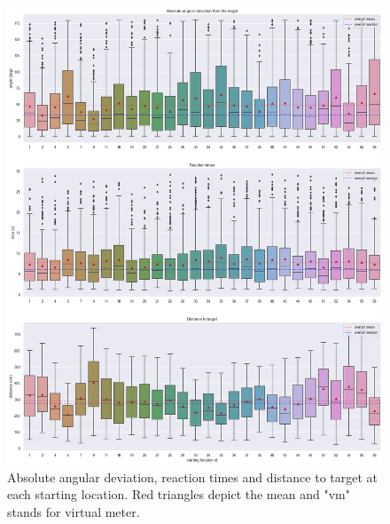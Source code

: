 \begin{figure}[!htb]
	\centering
	\includegraphics[width=160mm]{figures/ard_by_starting_locations_23.png}
	\caption[Box plot per starting location]{Absolute angular deviation, reaction times and distance to target at each starting location. Red triangles depict the mean and "vm" stands for virtual meter.}
	\label{fig:ard_by_starting_locations_23}
\end{figure}

